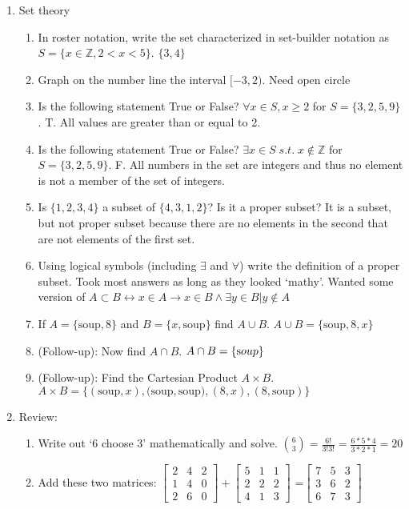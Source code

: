 \documentclass[11pt]{article}
\begin{document}
\begin{enumerate}
\item Set theory
\begin{enumerate}
\item In roster notation, write the set characterized in set-builder notation as $S = \{x \in \mathbb{Z}, 2 <x <5\}$. \color{gray} $\{ 3,4\}$\color{black}
\item Graph on the number line the interval $[-3, 2)$. \color{gray} Need open circle\color{black}
\item Is the following statement True or False? $\forall x \in S, x\geq 2$ for $S = \{3,2,5,9\}$. \color{gray} T. All values are greater than or equal to 2. \color{black}
\item Is the following statement True or False? $\exists x \in S\; s.t. \; x \notin \mathbb{Z}$ for $S = \{3,2,5,9\}$. \color{gray} F. All numbers in the set are integers and thus no element is not a member of the set of integers. \color{black}
\item Is $\{1,2,3,4\}$ a subset of $\{4,3,1,2\}$? Is it a proper subset? \color{gray} It is a subset, but not proper subset because there are no elements in the second that are not elements of the first set. \color{black}
\item Using logical symbols (including $\exists$ and $\forall$) write the definition of a proper subset.  \color{gray} Took most answers as long as they looked `mathy'. Wanted some version of $A \subset B \leftrightarrow  x \in A \rightarrow x\in B \wedge \exists y\in B | y \notin A $ \color{black}
\item If $A = \{\text{soup}, 8\}$ and $B = \{x, \text{soup}\}$ find $A \cup B$. \color{gray} $A \cup B= \{ \text{soup}, 8, x \}$\color{black}
\item (Follow-up): Now find $A \cap B$. \color{gray} $A \cap B= \{ \text soup\}$\color{black}
\item (Follow-up): Find the Cartesian Product $A \times B$. \color{gray} $A \times B = \{ (\text{soup}, x), (\text{soup}, \text{soup)}, (8, x), (8, \text{soup})\}$ \color{black}
\end{enumerate}

\item Review:
\begin{enumerate}
\item Write out `6 choose 3' mathematically and solve. \color{gray} $\binom{6}{3}=\frac{6!}{3!3!}=\frac{6*5*4}{3*2*1}=20$ \color{black}

\item Add these two matrices: $
\begin{bmatrix}
   2 & 4 & 2 \\
    1 & 4 & 0 \\
    2 & 6 & 0
\end{bmatrix}
+
\begin{bmatrix}
5 & 1 & 1 \\
2 & 2 & 2\\
4 & 1 & 3
\end{bmatrix}
$
{\color{gray}=$\begin{bmatrix}
7 & 5 & 3 \\
3 & 6 & 2\\
6 & 7 & 3
\end{bmatrix}$}



\end{enumerate}
\end{enumerate}
\end{document}
